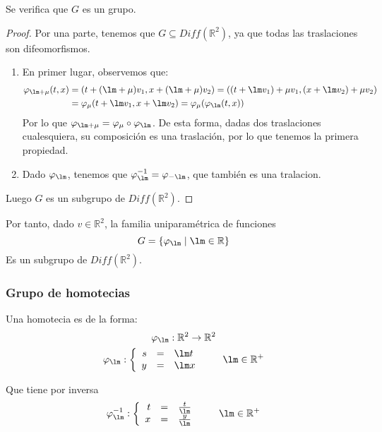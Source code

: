 \begin{prop}
    Se verifica que $G$ es un grupo.

    \begin{proof}
        Por una parte, tenemos que $G\subseteq Diff(\mathbb{R}^2)$, ya que todas las traslaciones son difeomorfismos. 
        \begin{enumerate}
            \item En primer lugar, observemos que:
                \begin{align*}
                    \varphi_{\lm + \mu}(t,x) &= (t+(\lm + \mu)v_1, x+(\lm+\mu)v_2) = ((t+\lm v_1)+\mu v_1, (x+\lm v_2)+\mu v_2) \\
                                             &= \varphi_\mu (t+\lm v_1, x+\lm v_2) = \varphi_\mu(\varphi_\lm(t,x))
                \end{align*}
                Por lo que $\varphi_{\lm + \mu} = \varphi_\mu \circ \varphi_\lm$. De esta forma, dadas dos traslaciones cualesquiera, su composición es una traslación, por lo que tenemos la primera propiedad.
            \item Dado $\varphi_\lm$, tenemos que $\varphi_\lm^{-1} = \varphi_{-\lm}$, que también es una tralacion.
        \end{enumerate}
        Luego $G$ es un subgrupo de $Diff(\mathbb{R}^2)$.
    \end{proof}
\end{prop}
Por tanto, dado $v\in \mathbb{R}^2$, la familia uniparamétrica de funciones
\begin{equation*}
    G = \{\varphi_\lm \mid \lm \in \mathbb{R}\}
\end{equation*}
Es un subgrupo de $Diff(\mathbb{R}^2)$.

\subsubsection{Grupo de homotecias}
Una homotecia es de la forma:
\begin{gather*}
    \varphi_\lm:\mathbb{R}^2 \rightarrow\mathbb{R}^2 \\
    \varphi_\lm: \left\{\begin{array}{rcl}
            s &= &\lm t \\
            y &= &\lm x
    \end{array}\right. \qquad \lm \in \mathbb{R}^+
\end{gather*}

Que tiene por inversa
\begin{equation*}
    \varphi_\lm^{-1}: \left\{\begin{array}{rcl}
            t &= &\frac{t}{\lm}\\
            x &= &\frac{y}{\lm}
    \end{array}\right. \qquad \lm \in \mathbb{R}^+
\end{equation*}

